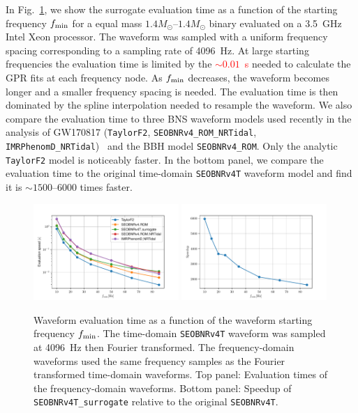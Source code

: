 \documentclass[prd,aps,letter,twocolumn,floatfix,notitlepage,nofootinbib]{revtex4-1}
\newcommand{\red}[1]{\textcolor{red}{#1}}
\begin{document}
In Fig.~\ref{fig:timing}, we show the surrogate evaluation time as a function of the starting frequency $f_{\rm min}$ for a equal mass $1.4M_\odot$--$1.4M_\odot$ binary evaluated on a 3.5~GHz Intel Xeon processor. The waveform was sampled with a uniform frequency spacing corresponding to a sampling rate of 4096~Hz. At large starting frequencies the evaluation time is limited by the \red{$\sim 0.01$~s} needed to calculate the GPR fits at each frequency node. As $f_{\rm min}$ decreases, the waveform becomes longer and a smaller frequency spacing is needed. The evaluation time is then dominated by the spline interpolation needed to resample the waveform. We also compare the evaluation time to three BNS waveform models used recently in the analysis of GW170817 (\texttt{TaylorF2}, \texttt{SEOBNRv4\_ROM\_NRTidal}, \texttt{IMRPhenomD\_NRTidal})~\cite{BNSPE} and the BBH model \texttt{SEOBNRv4\_ROM}. Only the analytic \texttt{TaylorF2} model is noticeably faster. In the bottom panel, we compare the evaluation time to the original time-domain \texttt{SEOBNRv4T} waveform model and find it is $\sim 1500$--6000 times faster.

\begin{figure}[htb]
\centering
\includegraphics[width=0.49\textwidth]{../src/TEOB-LAL-implementation/timings/Models_timings_FD_monotonic.pdf}
\includegraphics[width=0.49\textwidth]{../src/TEOB-LAL-implementation/timings/SEOBNRv4T_surrogate_speedup_deltaF_monontonic.pdf}
\caption{Waveform evaluation time as a function of the waveform starting frequency $f_{\rm min}$. The time-domain \texttt{SEOBNRv4T} waveform was sampled at 4096~Hz then Fourier transformed. The frequency-domain waveforms used the same frequency samples as the Fourier transformed time-domain waveforms. Top panel: Evaluation times of the frequency-domain waveforms. Bottom panel: Speedup of \texttt{SEOBNRv4T\_surrogate} relative to the original \texttt{SEOBNRv4T}.}
\label{fig:timing}
\end{figure}
\end{document}

